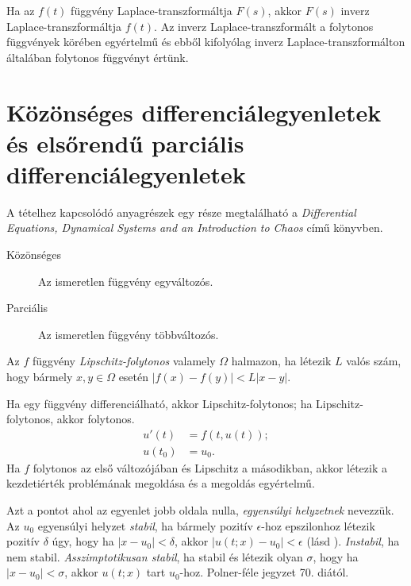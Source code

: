 \documentclass[%
	DIV=15,appendixprefix]{scrreprt}
\theoremstyle{definition}
\theoremstyle{remark}
\begin{document}
Ha az $ f \left( t \right) $ függvény Laplace-transzformáltja $ F \left( s \right) $, akkor
$ F \left( s \right) $ inverz Laplace-transzformáltja $ f \left( t \right) $. Az inverz
Laplace-transzformált a folytonos függvények körében egyértelmű és ebből kifolyólag inverz
Laplace-transzformálton általában folytonos függvényt értünk.
%
\section{Közönséges differenciálegyenletek és elsőrendű parciális differenciálegyenletek}
A tételhez kapcsolódó anyagrészek egy része megtalálható a \emph{Differential Equations, Dynamical
Systems and an Introduction to Chaos} \cite{DE} című könyvben.
%
\begin{description}
	\item[Közönséges] Az ismeretlen függvény egyváltozós.
	\item[Parciális] Az ismeretlen függvény többváltozós.
\end{description}
Az $f$ függvény \emph{Lipschitz-folytonos} valamely $\Omega$ halmazon, ha létezik $L$ valós szám,
hogy bármely $ x,{} y \in \Omega $ esetén $ \left| f \left( x \right) - f \left( y \right) \right|
< L  \left| x - y \right|$.

Ha egy függvény differenciálható, akkor Lipschitz-folytonos; ha Lipschitz-folytonos, akkor
folytonos.
\begin{equation}\tag{KÉP}
	\begin{aligned}
		u' \left( t \right)  &= f \left( t,{} u \left( t \right)  \right);\\
		u \left( t_{ 0 } \right) &= u_0.
	\end{aligned}
\end{equation}
%
Ha $f$ folytonos az első változójában és Lipschitz a másodikban, akkor létezik a kezdetiérték
problémának megoldása és a megoldás egyértelmű.

Azt a pontot ahol az egyenlet jobb oldala nulla, \emph{egyensúlyi helyzetnek} nevezzük. Az $u_{ 0 }$
egyensúlyi helyzet \emph{stabil}, ha bármely pozitív $ \epsilon $-hoz epszilonhoz létezik pozitív
$ \delta $ úgy, hogy ha $ \left| x - u_{ 0 } \right| < \delta $, akkor $ \left| u \left( t;{} x
\right) - u_0 \right| < \epsilon $ (lásd \cite[175.~oldal]{DE}). \emph{Instabil}, ha nem stabil.
\emph{Asszimptotikusan stabil}, ha stabil és létezik olyan $\sigma$, hogy ha $\left| x - u_{ 0 }
\right| < \sigma$, akkor $u \left( t;{} x \right)$ tart $ u_{ 0 } $-hoz.
%
Polner-féle jegyzet 70. diától.
\end{document}
